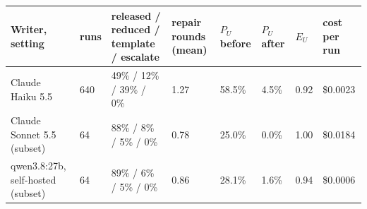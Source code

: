 \begin{tabular}{p{4cm}p{1cm}p{2.3cm}p{1.1cm}p{1.2cm}p{1.2cm}p{1cm}p{1.2cm}}
\toprule
\textbf{Writer, setting} & \textbf{runs} & \textbf{released / reduced / template / escalate} & \textbf{repair rounds (mean)} & \textbf{$P_U$ before} & \textbf{$P_U$ after} & \textbf{$E_U$} & \textbf{cost per run} \\
\midrule
Claude Haiku 5.5 & 640 & 49\% / 12\% / 39\% / 0\% & 1.27 & 58.5\% & 4.5\% & 0.92 & \$0.0023 \\
Claude Sonnet 5.5 (subset) & 64 & 88\% / 8\% / 5\% / 0\% & 0.78 & 25.0\% & 0.0\% & 1.00 & \$0.0184 \\
qwen3.8:27b, self-hosted (subset) & 64 & 89\% / 6\% / 5\% / 0\% & 0.86 & 28.1\% & 1.6\% & 0.94 & \$0.0006 \\
\bottomrule
\end{tabular}
